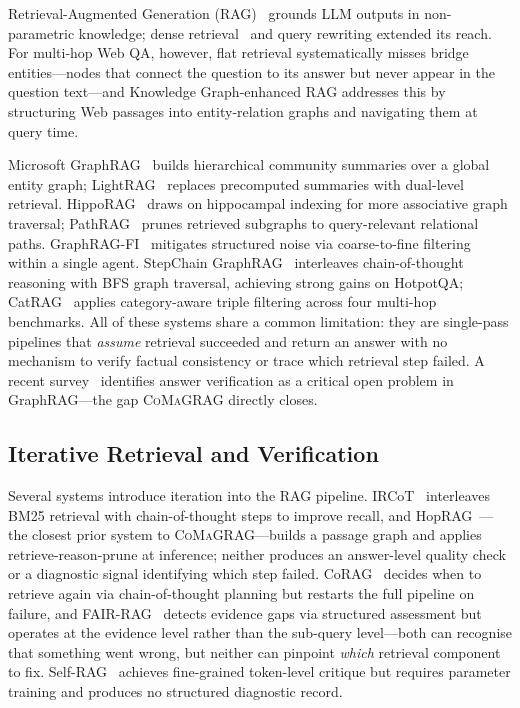 \documentclass[runningheads]{llncs}
\newcommand{\sys}{\textsc{CoMaGRAG}\xspace}
\begin{document}
Retrieval-Augmented Generation (RAG)~\cite{lewis2020rag} grounds LLM outputs
in non-parametric knowledge; dense retrieval~\cite{karpukhin2020dpr} and query
rewriting extended its reach. For multi-hop Web QA, however, flat retrieval
systematically misses bridge entities---nodes that connect the question to its
answer but never appear in the question text---and Knowledge Graph-enhanced RAG
addresses this by structuring Web passages into entity-relation graphs and
navigating them at query time.

Microsoft GraphRAG~\cite{edge2024graphrag} builds hierarchical community
summaries over a global entity graph; LightRAG~\cite{guo2024lightrag} replaces
precomputed summaries with dual-level retrieval. HippoRAG~\cite{gutierrez2024hipporag}
draws on hippocampal indexing for more associative graph traversal;
PathRAG~\cite{chen2025pathrag} prunes retrieved subgraphs to query-relevant
relational paths. GraphRAG-FI~\cite{guo2025graphragfi} mitigates structured
noise via coarse-to-fine filtering within a single agent. StepChain
GraphRAG~\cite{stepchain2025} interleaves chain-of-thought reasoning with BFS
graph traversal, achieving strong gains on HotpotQA; CatRAG~\cite{catrag2025}
applies category-aware triple filtering across four multi-hop benchmarks.
All of these systems share a common limitation: they are single-pass pipelines
that \emph{assume} retrieval succeeded and return an answer with no mechanism
to verify factual consistency or trace which retrieval step failed.
A recent survey~\cite{han2025graphragsurvey} identifies answer verification as
a critical open problem in GraphRAG---the gap \sys directly closes.

\subsection{Iterative Retrieval and Verification}

Several systems introduce iteration into the RAG pipeline.
IRCoT~\cite{trivedi2022ircot} interleaves BM25 retrieval with chain-of-thought
steps to improve recall, and HopRAG~\cite{yu2025hoprag}---the closest prior
system to \sys---builds a passage graph and applies retrieve-reason-prune at
inference; neither produces an answer-level quality check or a diagnostic
signal identifying which step failed.
CoRAG~\cite{lyu2025corag} decides when to retrieve again via chain-of-thought
planning but restarts the full pipeline on failure, and FAIR-RAG~\cite{fairrag2025}
detects evidence gaps via structured assessment but operates at the evidence
level rather than the sub-query level---both can recognise that something went
wrong, but neither can pinpoint \emph{which} retrieval component to fix.
Self-RAG~\cite{asai2023selfrag} achieves fine-grained token-level critique but
requires parameter training and produces no structured diagnostic record.
\end{document}
